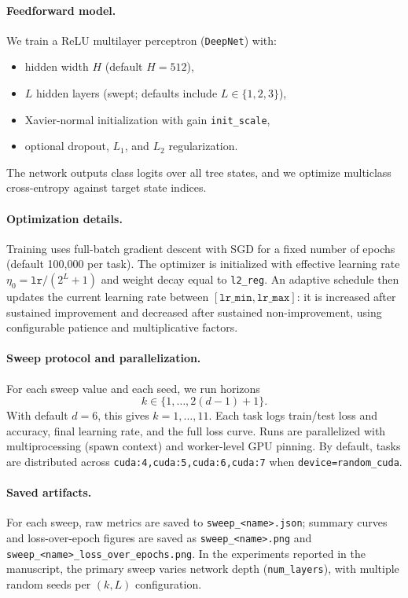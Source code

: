 \documentclass{article}
\begin{document}
\paragraph{Feedforward model.}
We train a ReLU multilayer perceptron (\texttt{DeepNet}) with:
\begin{itemize}
\item hidden width \(H\) (default \(H=512\)),
\item \(L\) hidden layers (swept; defaults include \(L\in\{1,2,3\}\)),
\item Xavier-normal initialization with gain \texttt{init\_scale},
\item optional dropout, \(L_1\), and \(L_2\) regularization.
\end{itemize}
The network outputs class logits over all tree states, and we optimize multiclass
cross-entropy against target state indices.

\paragraph{Optimization details.}
Training uses full-batch gradient descent with SGD for a fixed number of epochs
(default 100,000 per task). The optimizer is initialized with effective learning rate
\(\eta_0=\texttt{lr}/(2^L+1)\) and weight decay equal to \texttt{l2\_reg}.
An adaptive schedule then updates the current learning rate between
\([\texttt{lr\_min},\texttt{lr\_max}]\): it is increased after sustained improvement and
decreased after sustained non-improvement, using configurable patience and multiplicative factors.

\paragraph{Sweep protocol and parallelization.}
For each sweep value and each seed, we run horizons
\[
k \in \{1,\dots,2(d-1)+1\}.
\]
With default \(d=6\), this gives \(k=1,\dots,11\).
Each task logs train/test loss and accuracy, final learning rate, and the full loss curve.
Runs are parallelized with multiprocessing (spawn context) and worker-level GPU pinning.
By default, tasks are distributed across
\texttt{cuda:4,cuda:5,cuda:6,cuda:7} when \texttt{device=random\_cuda}.

\paragraph{Saved artifacts.}
For each sweep, raw metrics are saved to
\texttt{sweep\_<name>.json}; summary curves and loss-over-epoch figures are saved as
\texttt{sweep\_<name>.png} and \texttt{sweep\_<name>\_loss\_over\_epochs.png}.
In the experiments reported in the manuscript, the primary sweep varies network depth
(\texttt{num\_layers}), with multiple random seeds per \((k,L)\) configuration.
\end{document}
